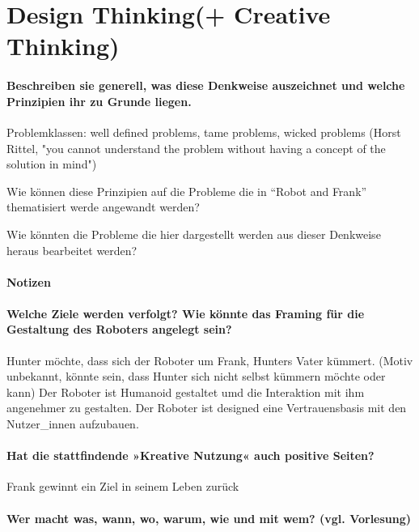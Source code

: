 \documentclass[sigchi-a, authorversion]{acmart}
\begin{document}
\section{Design Thinking(+ Creative Thinking)}

\paragraph{Beschreiben sie generell, was diese Denkweise auszeichnet und welche Prinzipien ihr zu Grunde liegen.}

Problemklassen:
	well defined problems,
	tame problems,
	wicked problems (Horst Rittel, "you cannot understand the problem without having a concept of the solution in mind")

Wie können diese Prinzipien auf die Probleme die in ``Robot and Frank'' thematisiert werde angewandt werden?

Wie könnten die Probleme die hier dargestellt werden aus dieser Denkweise heraus bearbeitet werden?

\paragraph{Notizen}

\paragraph{Welche Ziele werden verfolgt? Wie könnte das Framing für die Gestaltung des Roboters angelegt sein?}

Hunter möchte, dass sich der Roboter um Frank, Hunters Vater kümmert. (Motiv unbekannt, könnte sein, dass Hunter sich nicht selbst kümmern möchte oder kann)
Der Roboter ist Humanoid gestaltet umd die Interaktion mit ihm angenehmer zu gestalten.
Der Roboter ist designed eine Vertrauensbasis mit den Nutzer\_innen aufzubauen.

\paragraph{Hat die stattfindende »Kreative Nutzung« auch positive Seiten?}

Frank gewinnt ein Ziel in seinem Leben zurück

\paragraph{Wer macht was, wann, wo, warum, wie und mit wem? (vgl. Vorlesung)}
\end{document}
